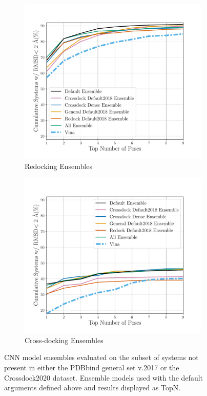 \documentclass[journal=jcisd8,manuscript=article]{achemso}
\begin{document}
\begin{figure}    
        \begin{subfigure}[b]{0.48\textwidth}    
		\centering
		\includegraphics[width=\textwidth]{figures/redocking/ensemble_models_no2017_nocd2020_line.pdf}
		\caption{Redocking Ensembles}
		\label{fig:No2017NoCD20EnsRD}
        \end{subfigure}    
        \begin{subfigure}[b]{0.48\textwidth}    
		\centering
		\includegraphics[width=\textwidth]{figures/crossdocking/ensemble_models_no2017_nocd2020_line.pdf}
		\caption{Cross-docking Ensembles}
                \label{fig:No2017NoCD20EnsCD}
        \end{subfigure}
	\caption{CNN model ensembles evaluated on the subset of systems not present in either the PDBbind general set v.2017 or the Crossdock2020 dataset. Ensemble models used with the default arguments defined above and results displayed as TopN.}
	\label{fig:No2017NoCD20}
\end{figure}  
\end{document}
